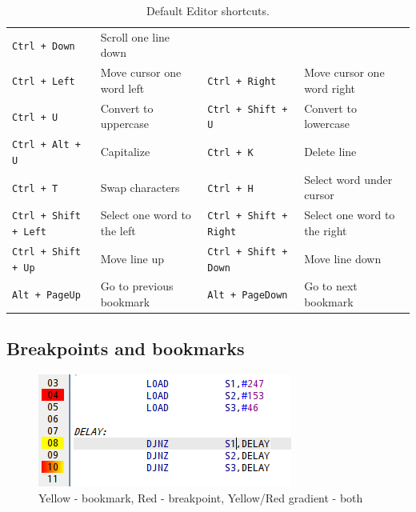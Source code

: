\begin{table}[h!]
{\begin{tabular}{|ll|ll|}
                        \texttt{Ctrl + Down}                & Scroll one line down          \\
                        \texttt{Ctrl + Left}                & Move cursor one word left     &
                        \texttt{Ctrl + Right}               & Move cursor one word right    \\
                        \texttt{Ctrl + U}                   & Convert to uppercase          &
                        \texttt{Ctrl + Shift + U}           & Convert to lowercase          \\
                        \texttt{Ctrl + Alt + U}             & Capitalize                    &
                        \texttt{Ctrl + K}                   & Delete line                   \\
                        \texttt{Ctrl + T}                   & Swap characters               &
                        \texttt{Ctrl + H}                   & Select word under cursor      \\
                        \texttt{Ctrl + Shift + Left}        & Select one word to the left   &
                        \texttt{Ctrl + Shift + Right}       & Select one word to the right  \\
                        \texttt{Ctrl + Shift + Up}          & Move line up                  &
                        \texttt{Ctrl + Shift + Down}        & Move line down                \\
                        \texttt{Alt + PageUp}               & Go to previous bookmark       &
                        \texttt{Alt + PageDown}             & Go to next bookmark           \\
                        \hline
                \end{tabular}
            }
            \caption{Default Editor shortcuts.}
        \end{table}

    \clearpage
    \subsection{Breakpoints and bookmarks}
         
        \begin{figure}
            \centering
                \includegraphics[width=.35\textwidth]{img/breakpoints1.png}
                \caption{Yellow - bookmark, Red - breakpoint, Yellow/Red gradient - both}
        \end{figure}

